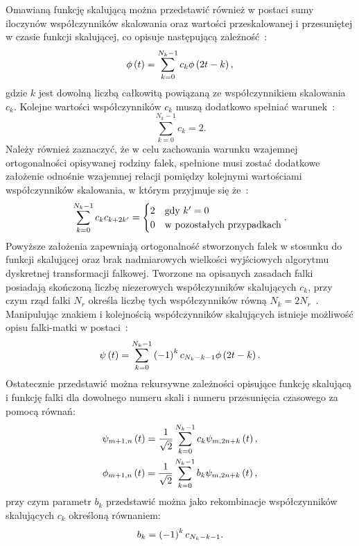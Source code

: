 Omawianą funkcję skalującą można przedstawić również w postaci sumy iloczynów współczynników skalowania oraz wartości przeskalowanej i przesuniętej w czasie funkcji skalującej, co opisuje następującą zależność~\cite{wallen_handbook}:
\begin{equation}
\phi \left(t\right) = \sum _{k=0} ^{N_k-1} c_{k} \phi \left( 2t - k \right) \label{eq:dwt_scalefunrek},
\end{equation}
gdzie $k$ jest dowolną liczbą całkowitą powiązaną ze współczynnikiem skalowania $c_k$. Kolejne wartości współczynników $c_k$ muszą dodatkowo spełniać warunek~\cite{wallen_handbook}:
\begin{equation}
\sum _{k=0} ^{N_k-1} c_{k} = 2 \label{eq:dwt_scalefunsum}.
\end{equation}
Należy również zaznaczyć, że w celu zachowania warunku wzajemnej ortogonalności opisywanej rodziny falek, spełnione musi zostać dodatkowe założenie odnośnie wzajemnej relacji pomiędzy kolejnymi wartościami współczynników skalowania, w którym przyjmuje się że~\cite{akujuobi_applications}:
\begin{equation}
\sum _{k=0} ^{N_k-1} c_{k} c_{k+2k'} =
\begin{cases}
	2 & $gdy$~k' = 0 \\
	0 & $w pozostałych przypadkach$
\end{cases}
\label{eq:dwt_scalemulort}.
\end{equation}
Powyższe założenia zapewniają ortogonalność stworzonych falek w stosunku do funkcji skalującej oraz brak nadmiarowych wielkości wyjściowych algorytmu dyskretnej transformacji falkowej. Tworzone na opisanych zasadach falki posiadają skończoną liczbę niezerowych współczynników skalujących $c_k$, przy czym rząd falki $N_r$ określa liczbę tych współczynników równą $N_{k} = 2 N_r$~\cite{lord_guide}. Manipulując znakiem i kolejnością współczynników skalujących istnieje możliwość opisu falki-matki w postaci~\cite{wallen_handbook}:
\begin{equation}
\psi \left(t\right) = \sum _{k=0} ^{N_k-1} \left(-1\right) ^{k} c_{N_k-k-1} \phi \left( 2t - k \right) \label{eq:dwt_waveletfunrek}.
\end{equation}
Ostatecznie przedstawić można rekursywne zależności opisujące funkcję skalującą i funkcję falki dla dowolnego numeru skali i numeru przesunięcia czasowego za pomocą równań:
\begin{gather}
\psi_{m+1,n} \left(t\right) = \frac{1}{\sqrt{2}} \sum _{k=0} ^{N_k-1} c_{k} \psi_{m,2n+k} \left(t\right) \label{eq:dwt_fatherrek}, \\
\phi_{m+1,n} \left(t\right) = \frac{1}{\sqrt{2}} \sum _{k=0} ^{N_k-1} b_{k} \psi_{m,2n+k} \left(t\right) \label{eq:dwt_matherrek},
\end{gather}
przy czym parametr $b_{k}$ przedstawić można jako rekombinacje współczynników skalujących $c_{k}$ określoną równaniem:
\begin{equation}
b_{k} = \left(-1\right) ^{k} c_{N_k-k-1} \label{eq:dwt_bk}.
\end{equation}

